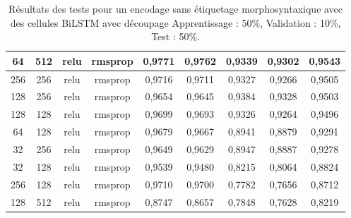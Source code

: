 \begin{table}[H]
{\begin{tabular}{|c|c|c|c|c|c|c|c|c|}
				64             & 512                     & relu                & rmsprop            & 0,9771                             & 0,9762                                & 0,9339                    & 0,9302                       & 0,9543                \\ \hline
				256            & 256                     & relu                & rmsprop            & 0,9716                             & 0,9711                                & 0,9327                    & 0,9266                       & 0,9505                \\ \hline
				128            & 256                     & relu                & rmsprop            & 0,9654                             & 0,9645                                & 0,9384                    & 0,9328                       & 0,9503                \\ \hline
				128            & 128                     & relu                & rmsprop            & 0,9699                             & 0,9693                                & 0,9326                    & 0,9264                       & 0,9496                \\ \hline
				64             & 128                     & relu                & rmsprop            & 0,9679                             & 0,9667                                & 0,8941                    & 0,8879                       & 0,9291                \\ \hline
				32             & 256                     & relu                & rmsprop            & 0,9649                             & 0,9629                                & 0,8947                    & 0,8887                       & 0,9278                \\ \hline
				32             & 128                     & relu                & rmsprop            & 0,9539                             & 0,9480                                & 0,8215                    & 0,8064                       & 0,8824                \\ \hline
				256            & 128                     & relu                & rmsprop            & 0,9710                             & 0,9700                                & 0,7782                    & 0,7656                       & 0,8712                \\ \hline
				128            & 512                     & relu                & rmsprop            & 0,8747                             & 0,8657                                & 0,7848                    & 0,7628                       & 0,8219                \\ \hline
			\end{tabular}%
		}
		\caption{Résultats des tests pour un encodage sans étiquetage morphosyntaxique avec des cellules BiLSTM avec découpage Apprentissage : 50\%, Validation : 10\%, Test : 50\%.}
		\label{tab:bilstm_2}
	\end{table}
	
